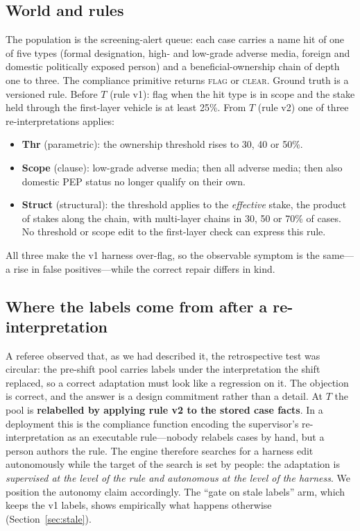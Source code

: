 \documentclass[11pt]{article}
\begin{document}
\subsection{World and rules}

The population is the screening-alert queue: each case carries a name hit of one of five types (formal designation, high- and low-grade adverse media, foreign and domestic politically exposed person) and a beneficial-ownership chain of depth one to three. The compliance primitive returns \textsc{flag} or \textsc{clear}. Ground truth is a versioned rule. Before $T$ (rule v1): flag when the hit type is in scope and the stake held through the first-layer vehicle is at least 25\%. From $T$ (rule v2) one of three re-interpretations applies:
\begin{itemize}
\item \textbf{Thr} (parametric): the ownership threshold rises to 30, 40 or 50\%.
\item \textbf{Scope} (clause): low-grade adverse media; then all adverse media; then also domestic PEP status no longer qualify on their own.
\item \textbf{Struct} (structural): the threshold applies to the \emph{effective} stake, the product of stakes along the chain, with multi-layer chains in 30, 50 or 70\% of cases. No threshold or scope edit to the first-layer check can express this rule.
\end{itemize}
All three make the v1 harness over-flag, so the observable symptom is the same---a rise in false positives---while the correct repair differs in kind.

\subsection{Where the labels come from after a re-interpretation}
\label{sec:labels}

A referee observed that, as we had described it, the retrospective test was circular: the pre-shift pool carries labels under the interpretation the shift replaced, so a correct adaptation must look like a regression on it. The objection is correct, and the answer is a design commitment rather than a detail. At $T$ the pool is \textbf{relabelled by applying rule v2 to the stored case facts}. In a deployment this is the compliance function encoding the supervisor's re-interpretation as an executable rule---nobody relabels cases by hand, but a person authors the rule. The engine therefore searches for a harness edit autonomously while the target of the search is set by people: the adaptation is \emph{supervised at the level of the rule and autonomous at the level of the harness}. We position the autonomy claim accordingly. The ``gate on stale labels'' arm, which keeps the v1 labels, shows empirically what happens otherwise (Section~\ref{sec:stale}).
\end{document}

